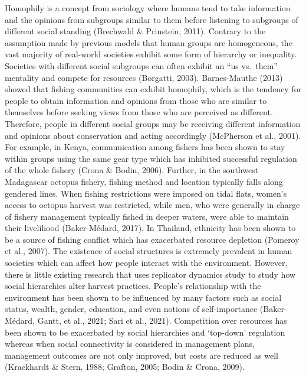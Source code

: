 \documentclass[
  12pt,
]{article}
\begin{document}
Homophily is a concept from sociology where humans tend to take information and the opinions from subgroups similar to them before listening to subgroups of different social standing (Brechwald \& Prinstein, 2011). Contrary to the assumption made by previous models that human groups are homogeneous, the vast majority of real-world societies exhibit some form of hierarchy or inequality. Societies with different social subgroups can often exhibit an ``us vs.~them'' mentality and compete for resources (Borgatti, 2003). Barnes-Mauthe (2013) showed that fishing communities can exhibit homophily, which is the tendency for people to obtain information and opinions from those who are similar to themselves before seeking views from those who are perceived as different. Therefore, people in different social groups may be receiving different information and opinions about conservation and acting accordingly (McPherson et al., 2001). For example, in Kenya, communication among fishers has been shown to stay within groups using the same gear type which has inhibited successful regulation of the whole fishery (Crona \& Bodin, 2006). Further, in the southwest Madagascar octopus fishery, fishing method and location typically falls along gendered lines. When fishing restrictions were imposed on tidal flats, women's access to octopus harvest was restricted, while men, who were generally in charge of fishery management typically fished in deeper waters, were able to maintain their livelihood (Baker-Médard, 2017). In Thailand, ethnicity has been shown to be a source of fishing conflict which has exacerbated resource depletion (Pomeroy et al., 2007). The existence of social structures is extremely prevalent in human societies which can affect how people interact with the environment. However, there is little existing research that uses replicator dynamics study to study how social hierarchies alter harvest practices. People's relationship with the environment has been shown to be influenced by many factors such as social status, wealth, gender, education, and even notions of self-importance (Baker-Médard, Gantt, et al., 2021; Sari et al., 2021). Competition over resources has been shown to be exacerbated by social hierarchies and `top-down' regulation whereas when social connectivity is considered in management plans, management outcomes are not only improved, but costs are reduced as well (Krackhardt \& Stern, 1988; Grafton, 2005; Bodin \& Crona, 2009).
\end{document}
